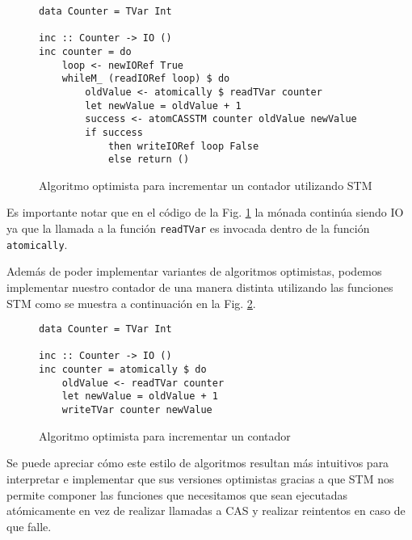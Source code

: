 \begin{figure}[H]
\begin{verbatim}
data Counter = TVar Int

inc :: Counter -> IO ()
inc counter = do
    loop <- newIORef True
    whileM_ (readIORef loop) $ do
        oldValue <- atomically $ readTVar counter
        let newValue = oldValue + 1
        success <- atomCASSTM counter oldValue newValue
        if success
            then writeIORef loop False
            else return ()
\end{verbatim}
\caption{Algoritmo optimista para incrementar un contador utilizando STM}
\label{fig:lockfree-counter-example-stm}
\end{figure}

Es importante notar que en el código de la Fig. \ref{fig:lockfree-counter-example-stm} la mónada continúa siendo IO ya que la llamada a la función \texttt{readTVar} es invocada dentro de la función \texttt{atomically}.

Además de poder implementar variantes de algoritmos optimistas, podemos implementar nuestro contador de una manera distinta utilizando las funciones STM como se muestra a continuación en la Fig. \ref{fig:counter-example-stm}.

\begin{figure}[H]
\begin{verbatim}
data Counter = TVar Int

inc :: Counter -> IO ()
inc counter = atomically $ do
    oldValue <- readTVar counter
    let newValue = oldValue + 1
    writeTVar counter newValue
\end{verbatim}
\caption{Algoritmo optimista para incrementar un contador}
\label{fig:counter-example-stm}
\end{figure}

Se puede apreciar cómo este estilo de algoritmos resultan más intuitivos para interpretar e implementar que sus versiones optimistas gracias a que STM nos permite componer las funciones que necesitamos que sean ejecutadas atómicamente en vez de realizar llamadas a CAS y realizar reintentos en caso de que falle.
